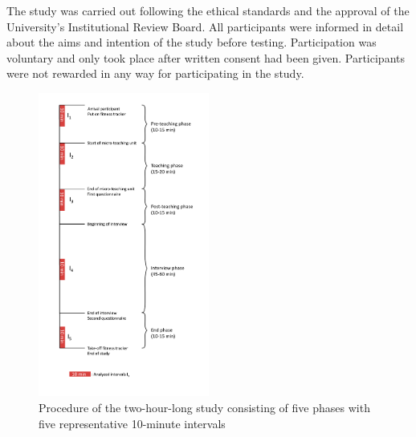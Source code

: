 \documentclass[preprint, 3p,
authoryear]{elsarticle} %
\begin{document}
The study was carried out following the ethical standards and the
approval of the University's Institutional Review Board. All
participants were informed in detail about the aims and intention of the
study before testing. Participation was voluntary and only took place
after written consent had been given. Participants were not rewarded in
any way for participating in the study.

\begin{figure}
  \centering
  \includegraphics[width=0.5\textwidth]{images/Timeline_small.pdf}
  \caption{Procedure of the two-hour-long study consisting of five phases with five representative 10-minute intervals}
  \label{Procedure of the two-hour-long study consisting of five phases with five representative 10-minute intervals}
\end{figure}
\end{document}

